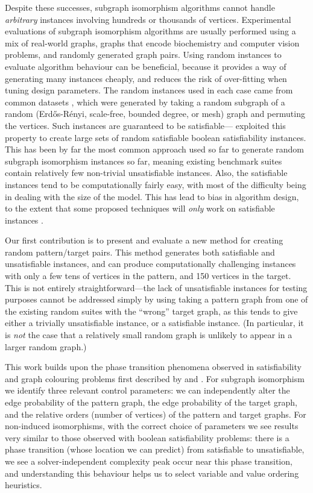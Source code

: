 \documentclass[twoside,11pt]{article}
\newcommand{\citet}[1]{\citeA{#1}}
\newcommand{\citep}[1]{\cite{#1}}
\begin{document}
Despite these successes, subgraph isomorphism algorithms cannot handle \emph{arbitrary} instances
involving hundreds or thousands of vertices. Experimental evaluations of subgraph isomorphism
algorithms are usually performed using a mix of real-world graphs, graphs that encode biochemistry
and computer vision problems, and randomly generated graph pairs. Using random instances to evaluate
algorithm behaviour can be beneficial, because it provides a way of generating many instances
cheaply, and reduces the risk of over-fitting when tuning design parameters. The random instances
used in each case came from common datasets \citep{DeSanto:2003,Zampelli:2010}, which were generated
by taking a random subgraph of a random (Erd\H{o}s-R\'enyi, scale-free, bounded degree, or mesh)
graph and permuting the vertices. Such instances are guaranteed to be
satisfiable---\citet{Anton:2009} exploited this property to create large sets of random satisfiable
boolean satisfiability instances.  This has been by far the most common approach used so far to
generate random subgraph isomorphism instances so far, meaning existing benchmark suites contain
relatively few non-trivial unsatisfiable instances.  Also, the satisfiable instances tend to be
computationally fairly easy, with most of the difficulty being in dealing with the size of the
model. This has lead to bias in algorithm design, to the extent that some proposed techniques will
\emph{only} work on satisfiable instances \citep{Battiti:2007}.

Our first contribution is to present and evaluate a new method for creating random pattern/target
pairs. This method generates both satisfiable and unsatisfiable instances, and can produce
computationally challenging instances with only a few tens of vertices in the pattern, and 150
vertices in the target. This is not entirely straightforward---the lack of unsatisfiable instances
for testing purposes cannot be addressed simply by using taking a pattern graph from one of the
existing random suites with the ``wrong'' target graph, as this tends to give either a trivially
unsatisfiable instance, or a satisfiable instance. (In particular, it is \emph{not} the case that a
relatively small random graph is unlikely to appear in a larger random graph.)

This work builds upon the phase transition phenomena observed in satisfiability and graph colouring
problems first described by \citet{DBLP:conf/ijcai/CheesemanKT91} and \citet{Mitchell:1992}.  For
subgraph isomorphism we identify three relevant control parameters: we can independently alter the
edge probability of the pattern graph, the edge probability of the target graph, and the relative
orders (number of vertices) of the pattern and target graphs.  For non-induced isomorphisms, with
the correct choice of parameters we see results very similar to those observed with boolean
satisfiability problems: there is a phase transition (whose location we can predict) from
satisfiable to unsatisfiable, we see a solver-independent complexity peak occur near this phase
transition, and understanding this behaviour helps us to select variable and value ordering
heuristics.
\end{document}

